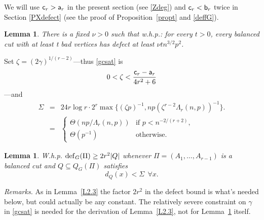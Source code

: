 \documentclass[letterpaper,11pt]{article}
\newtheorem{lemma}[thm]{Lemma}
\newcommand{\beq}[1]{\begin{equation}\label{#1}}
\newcommand{\enq}[0]{\end{equation}}
\newcommand{\mn}[0]{\medskip\noindent}
\newcommand{\sub}[0]{\subseteq}
\renewcommand{\dots}[0]{,\ldots,}
\newcommand{\deff}[0]{{\rm def}}
\newcommand{\cc}[0]{\mbox{{\sf c}}}
\newcommand{\aaa}[0]{\mbox{{\sf a}}}
\newcommand{\bbb}[0]{\mbox{{\sf b}}}
\newcommand{\0}[0]{\emptyset}
\newcommand{\gc}[0]{\gamma }
\newcommand{\gL}[0]{\Lambda}
\newcommand{\gS}[0]{\Sigma}
\newcommand{\gz}[0]{\zeta}
\newcommand{\glr}[0]{\gL_r(n,p)}
\begin{document}
We will use $\cc_r>\aaa_r$ in the present section
(see \eqref{Zdeg}) and $\cc_r< \bbb_r$ twice in
Section \ref{PXdefect}
(see the proof of Proposition~\ref{propt} and
\eqref{deffG}).

\iffalse
\mn
The inequality is of course easily verified, but
we don't see any
``good" reason why it should be so;
yet our proof (of Theorem~\ref{MT}) collapses if it is not.
\fi









%
\begin{lemma}\label{Xdefect}
There is a fixed $\nu>0$ such that
w.h.p.: for every $t>0$, every balanced cut with at least t bad
vertices has defect at least
$\nu t n^{3/2}p^2$.
\end{lemma}
%






\medskip
Set $\gz=(2\gc)^{1/(r-2)}$---thus \eqref{gcsat} is
\beq{gzsat}
0<\gz <
\frac{\cc_r-\aaa_r}{4r^2+6}
\enq
---and
\begin{eqnarray}
\gS &= &
24r\log r\cdot2^r
\max \{(\gz p)^{-1},np(\gz^{r-2}\glr)^{-1}\}.
\nonumber\\
&=&\left\{\begin{array}{ll}
\Theta(np/\gL_r(n,p))&\mbox{if $p<n^{-2/(r+2)}$,}\\
\Theta(p^{-1})&\mbox{otherwise.}
\end{array}\right.\label{s}
\end{eqnarray}

%
\begin{lemma}\label{L2.3'}
W.h.p. $\deff_G(\Pi)\geq 2r^2|Q|$ whenever
$\Pi=(A_1\dots A_{r-1})$ is a balanced cut and
$Q\sub Q_G(\Pi)$
satisfies
\beq{dQx}
d_Q(x)< \gS ~~\forall x.
\enq
\end{lemma}
%


\mn
{\em Remarks.}
As in Lemma~\ref{L2.3} the factor $2r^2$ in the defect bound
is what's needed below, but
could actually be any constant.
The relatively severe constraint on $\gc$ in
\eqref{gcsat} is needed for the derivation of Lemma~\ref{L2.3}, not for
Lemma~\ref{L2.3'} itself.
\end{document}
